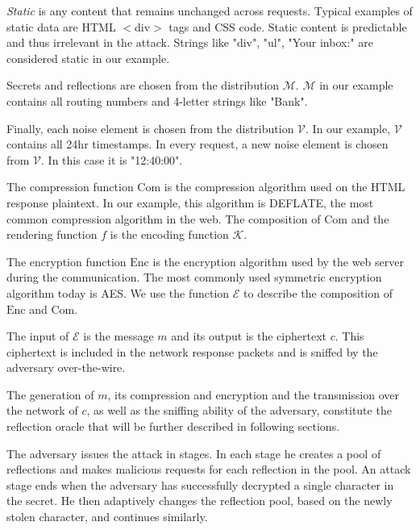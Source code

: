 \textit{Static} is any content that remains unchanged across requests. Typical
examples of static data are HTML $<$div$>$ tags and CSS code. Static content is
predictable and thus irrelevant in the attack. Strings like "div", "ul", "Your
inbox:" are considered static in our example.

Secrets and reflections are chosen from the distribution $\mathcal{M}$.
$\mathcal{M}$ in our example contains all routing numbers and 4-letter strings
like "Bank".

Finally, each noise element is chosen from the distribution $\mathcal{V}$. In
our example, $\mathcal{V}$ contains all 24hr timestamps. In every request, a new
noise element is chosen from $\mathcal{V}$. In this case it is "12:40:00".

The compression function $\textrm{Com}$ is the compression algorithm used on the
HTML response plaintext. In our example, this algorithm is DEFLATE, the most
common compression algorithm in the web. The composition of $\textrm{Com}$ and
the rendering function $f$ is the encoding function $\mathcal{K}$.

The encryption function $\textrm{Enc}$ is the encryption algorithm used by the
web server during the communication. The most commonly used symmetric encryption
algorithm today is AES. We use the function $\mathcal{E}$ to describe the
composition of $\textrm{Enc}$ and $\textrm{Com}$.

The input of $\mathcal{E}$ is the message $m$ and its output is the ciphertext
$c$.  This ciphertext is included in the network response packets and is sniffed
by the adversary over-the-wire.

The generation of $m$, its compression and encryption and the transmission over
the network of $c$, as well as the sniffing ability of the adversary, constitute
the reflection oracle that will be further described in following sections.

The adversary issues the attack in stages. In each stage he creates a pool of
reflections and makes malicious requests for each reflection in the pool. An
attack stage ends when the adversary has successfully decrypted a single
character in the secret. He then adaptively changes the reflection pool, based
on the newly stolen character, and continues similarly.
